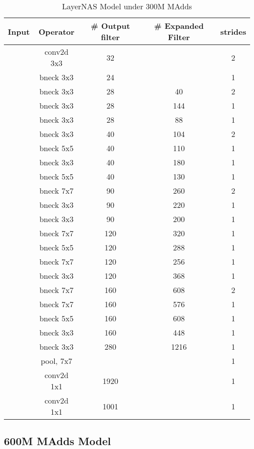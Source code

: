 \begin{table}
\caption{LayerNAS Model under 300M MAdds} 
\begin{center}

\begin{tabular}[hp]{c|c|c|c|c}
\hline
\hline
 Input &Operator  &\# Output filter &\# Expanded Filter &strides\\ 
\hline
  &conv2d 3x3 &32 & &2 \\
\hline
  &bneck 3x3 &24 & &1 \\
\hline
  &bneck 3x3 &28 &40 &2 \\
  &bneck 3x3 &28 &144 &1 \\
  &bneck 3x3 &28 &88 &1 \\
\hline
  &bneck 3x3 &40 &104 &2 \\
  &bneck 5x5 &40 &110 &1 \\
  &bneck 3x3 &40 &180 &1 \\
  &bneck 5x5 &40 &130 &1 \\
\hline
  &bneck 7x7 &90 &260 &2 \\
  &bneck 3x3 &90 &220 &1 \\
  &bneck 3x3 &90 &200 &1 \\
\hline
  &bneck 7x7 &120 &320 &1 \\
  &bneck 5x5 &120 &288 &1 \\
  &bneck 7x7 &120 &256 &1 \\
  &bneck 3x3 &120 &368 &1 \\
 \hline
  &bneck 7x7 &160 &608 &2 \\
  &bneck 7x7 &160 &576 &1 \\
  &bneck 5x5 &160 &608 &1 \\
  &bneck 3x3 &160 &448 &1 \\
 \hline
  &bneck 3x3 &280 &1216 &1 \\
\hline
  &pool, 7x7  & & &1\\
  &conv2d 1x1  &1920 & &1 \\
  &conv2d 1x1 &1001 & &1 \\
\hline
\hline

\end{tabular}
\end{center}
\end{table}


\subsection{600M MAdds Model}


